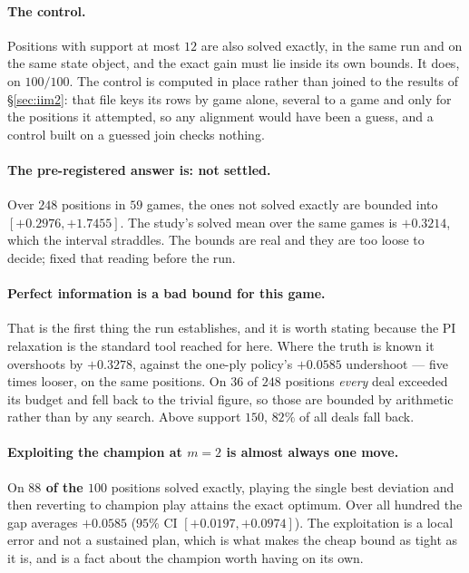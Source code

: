 \documentclass[11pt,letterpaper]{article}
\begin{document}
\paragraph{The control.} Positions with support at most $12$ are also solved
exactly, in the same run and on the same state object, and the exact gain must
lie inside its own bounds. It does, on \textbf{$100/100$}. The control is
computed in place rather than joined to the results of \S\ref{sec:iim2}: that
file keys its rows by game alone, several to a game and only for the positions
it attempted, so any alignment would have been a guess, and a control built
on a guessed join checks nothing.

\paragraph{The pre-registered answer is: not settled.} Over $248$ positions in
$59$ games, the ones not solved exactly are bounded into
$[\mathbf{+0.2976}, \mathbf{+1.7455}]$. The study's solved mean over the same
games is $+0.3214$, which the interval straddles. The bounds are real and they
are too loose to decide;  fixed that reading
before the run.

\paragraph{Perfect information is a bad bound for this game.} That is the
first thing the run establishes, and it is worth stating because the PI
relaxation is the standard tool reached for here. Where the truth is known it
overshoots by $+0.3278$, against the one-ply policy's $+0.0585$ undershoot ---
five times looser, on the same positions. On $36$ of $248$ positions
\emph{every} deal exceeded its budget and fell back to the trivial figure, so
those are bounded by arithmetic rather than by any search. Above support
$150$, $82\%$ of all deals fall back.

\paragraph{Exploiting the champion at $m = 2$ is almost always one move.}
On \textbf{$88$ of the $100$} positions solved exactly, playing the single best
deviation and then reverting to champion play attains the exact optimum. Over
all hundred the gap averages $+0.0585$ ($95\%$ CI $[+0.0197, +0.0974]$). The
exploitation is a local error and not a sustained plan, which is what makes
the cheap bound as tight as it is, and is a fact about the champion worth
having on its own.
\end{document}
